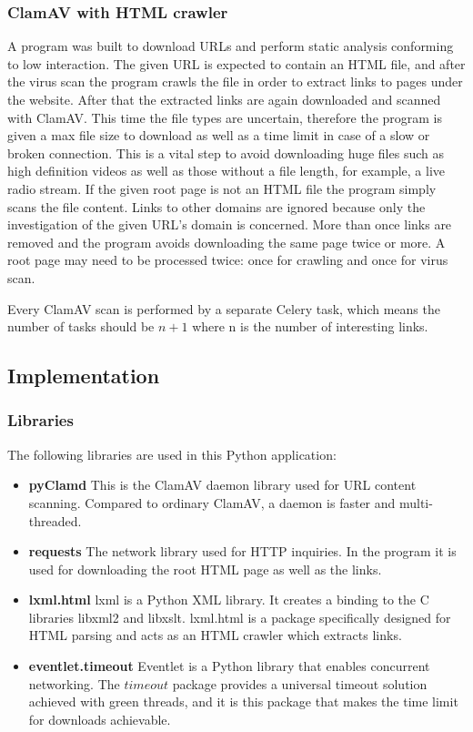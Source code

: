 \subsubsection{ClamAV with HTML crawler}
A program was built to download URLs and perform static analysis conforming to low interaction. The given URL is expected to contain 
an HTML file, and after the virus scan the program crawls the file in order to extract links to pages 
under the website. After that the extracted links are again downloaded and 
scanned with ClamAV. This time the file types are uncertain, therefore the program is given a max file size to download as well as a time limit in case of a 
slow or broken connection. This is a vital step to avoid downloading huge files such as 
high definition videos as well as those without a file length, for example, a live radio stream.
If the given root page is not an HTML file the program simply scans the file content. 
Links to other domains are ignored because only the investigation 
of the given URL's domain is concerned. More than once links are removed and the 
program avoids downloading the same page twice or more. A root page may need 
to be processed twice: once for crawling and once for virus scan.

Every ClamAV scan is performed by a separate Celery task, which means the 
number of tasks should be $n+1$ where n is the number of interesting links.

\subsection{Implementation}
\subsubsection{Libraries}
The following libraries are used in this Python application:
\begin{itemize}
\item {\bf pyClamd} This is the ClamAV daemon library used for URL content 
scanning. Compared to ordinary ClamAV, a daemon is faster and 
multi-threaded. 

\item {\bf requests} The network library used for HTTP inquiries. In the 
program it is used for downloading the root HTML page as well as the links. 

\item {\bf lxml.html} lxml is a Python XML library. It creates a 
binding to the C libraries libxml2 and libxslt.\cite{lxml} lxml.html is a 
package specifically designed for HTML parsing and acts as an HTML crawler 
which extracts links. 

\item {\bf eventlet.timeout} Eventlet is a Python library that enables 
concurrent networking. The $timeout$ package provides a universal timeout 
solution achieved with green threads, and it is this package that makes the time limit 
for downloads achievable. 
\end{itemize}

